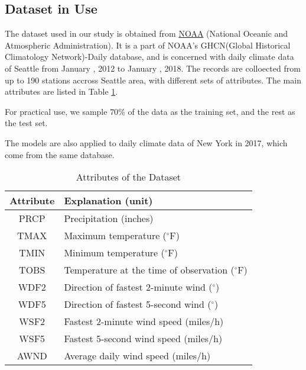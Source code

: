 \subsection{Dataset in Use}

The dataset used in our study is obtained from \href{https://www.ncdc.noaa.gov/cdo-web/}{NOAA} (National Oceanic and Atmospheric Administration). It is a part of NOAA's GHCN(Global Historical Climatology Network)-Daily database\cite{noaa}, and is concerned with daily climate data of Seattle from January , 2012 to January , 2018. The records are colloected from up to 190 stations accross Seattle area, with different sets of attributes. The main attributes are listed in Table \ref{tbld}.

For practical use, we sample $70\%$ of the data as the training set, and the rest as the test set.

The models are also applied to daily climate data of New York in 2017, which come from the same database.

\begin{table}[h]
\setlength{\belowcaptionskip}{5pt}
\caption{Attributes of the Dataset}
\label{tbld}
\centering
\renewcommand\arraystretch{1.5}
\begin{tabular}{|c|l|}
\hline
\textbf{Attribute} & \textbf{Explanation (unit)}\\
\hline
PRCP & Precipitation (inches)\\
\hline
TMAX & Maximum temperature ($^\circ$F)\\
\hline
TMIN & Minimum temperature ($^\circ$F)\\
\hline
TOBS & Temperature at the time of observation ($^\circ$F)\\
\hline
WDF2 & Direction of fastest 2-minute wind ($^\circ$)\\
\hline
WDF5 & Direction of fastest 5-second wind ($^\circ$)\\
\hline
WSF2 & Fastest 2-minute wind speed (miles/h)\\
\hline
WSF5 & Fastest 5-second wind speed (miles/h)\\
\hline
AWND & Average daily wind speed (miles/h)\\
\hline
\end{tabular}
\end{table}